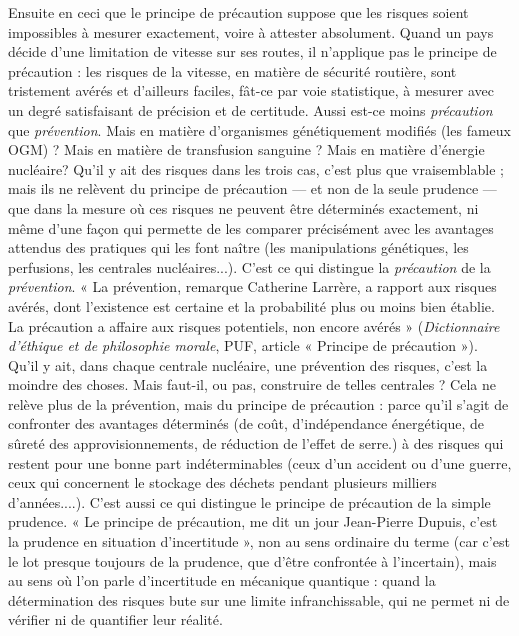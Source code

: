 Ensuite en ceci que le principe de précaution suppose que les risques soient
impossibles à mesurer exactement, voire à attester absolument. Quand un pays
décide d’une limitation de vitesse sur ses routes, il n’applique pas le principe de
précaution : les risques de la vitesse, en matière de sécurité routière, sont tristement
avérés et d’ailleurs faciles, fât-ce par voie statistique, à mesurer avec un
degré satisfaisant de précision et de certitude. Aussi est-ce moins {\it précaution} que
{\it prévention}. Mais en matière d'organismes génétiquement modifiés (les fameux
OGM) ? Mais en matière de transfusion sanguine ? Mais en matière d’énergie
nucléaire? Qu'il y ait des risques dans les trois cas, c’est plus que
vraisemblable ; mais ils ne relèvent du principe de précaution — et non de la
seule prudence — que dans la mesure où ces risques ne peuvent être déterminés
exactement, ni même d’une façon qui permette de les comparer précisément
avec les avantages attendus des pratiques qui les font naître (les manipulations
génétiques, les perfusions, les centrales nucléaires...). C’est ce qui distingue la
{\it précaution} de la {\it prévention}. « La prévention, remarque Catherine Larrère, a rapport
aux risques avérés, dont l'existence est certaine et la probabilité plus ou
moins bien établie. La précaution a affaire aux risques potentiels, non encore
avérés » ({\it Dictionnaire d'éthique et de philosophie morale}, PUF, article « Principe
de précaution »). Qu'il y ait, dans chaque centrale nucléaire, une prévention
des risques, c’est la moindre des choses. Mais faut-il, ou pas, construire de telles
centrales ? Cela ne relève plus de la prévention, mais du principe de
précaution : parce qu'il s’agit de confronter des avantages déterminés (de coût,
d'indépendance énergétique, de sûreté des approvisionnements, de réduction
de l'effet de serre.) à des risques qui restent pour une bonne part indéterminables
(ceux d’un accident ou d’une guerre, ceux qui concernent le stockage
des déchets pendant plusieurs milliers d’années....). C’est aussi ce qui distingue
le principe de précaution de la simple prudence. « Le principe de précaution,
me dit un jour Jean-Pierre Dupuis, c’est la prudence en situation d’incertitude »,
non au sens ordinaire du terme (car c’est le lot presque toujours de la
prudence, que d’être confrontée à l’incertain), mais au sens où l’on parle
d'incertitude en mécanique quantique : quand la détermination des risques
bute sur une limite infranchissable, qui ne permet ni de vérifier ni de quantifier
leur réalité.

